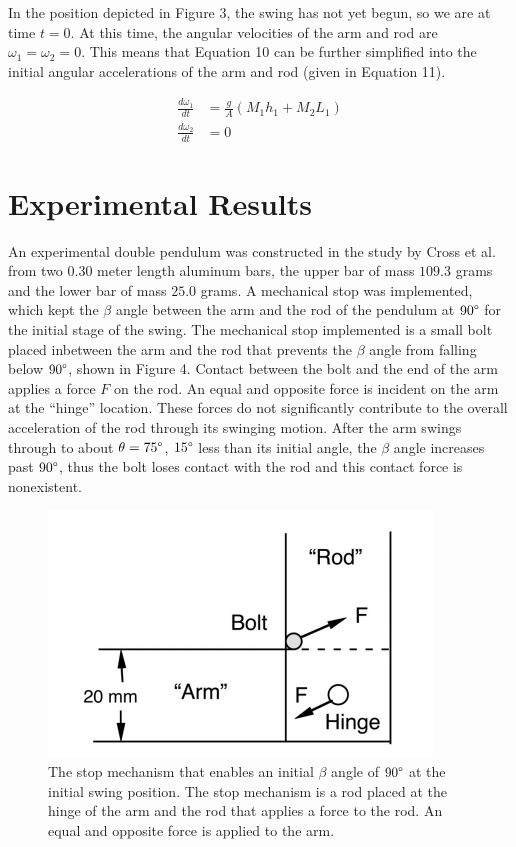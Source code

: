 \documentclass[%
 aip,
 amsmath,amssymb,
 reprint,%
 floatfix,%
]{revtex4-1}
\begin{document}
In the position depicted in Figure 3, the swing has not yet begun, so we are at time $t=0$. At this time, the angular velocities of the arm and rod are $\omega_1=\omega_2=0$. This means that Equation 10 can be further simplified into the initial angular accelerations of the arm and rod (given in Equation 11).

\begin{equation}
	\begin{aligned}
		\frac{d\omega_1}{dt} & = \frac{g}{A}(M_1 h_1 + M_2 L_1) \\
		\frac{d\omega_2}{dt} & = 0
	\end{aligned}
\end{equation}

\section{\label{sec:level3}Experimental Results}

An experimental double pendulum was constructed in the study by Cross et al.\cite{Cross2005} from two $0.30$ meter length aluminum bars, the upper bar of mass $109.3$ grams and the lower bar of mass $25.0$ grams. A mechanical stop was implemented, which kept the $\beta$ angle between the arm and the rod of the pendulum at $90 \degree$ for the initial stage of the swing. The mechanical stop implemented is a small bolt placed inbetween the arm and the rod that prevents the $\beta$ angle from falling below $90\degree$, shown in Figure 4. Contact between the bolt and the end of the arm applies a force $F$ on the rod. An equal and opposite force is incident on the arm at the “hinge” location. These forces do not significantly contribute to the overall acceleration of the rod through its swinging motion. After the arm swings through to about $\theta = 75\degree$, $15\degree$ less than its initial angle, the $\beta$ angle increases past $90\degree$, thus the bolt loses contact with the rod and this contact force is nonexistent.

\begin{figure}[H]
	\centering
	\includegraphics[scale=0.4]{stopmechanism.png}
	\caption{The stop mechanism that enables an initial $\beta$ angle of $90\degree$ at the initial swing position. The stop mechanism is a rod placed at the hinge of the arm and the rod that applies a force to the rod. An equal and opposite force is applied to the arm.}
\end{figure}
\end{document}
